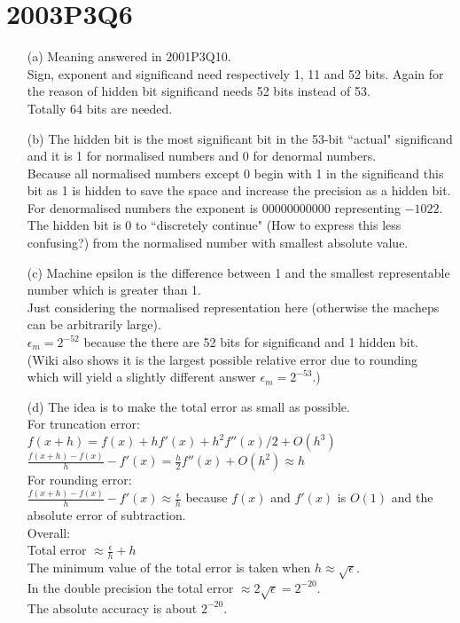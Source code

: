 \documentclass[10pt,twoside,a4paper]{article}
\begin{document}
\section*{2003P3Q6}
\begin{itemize}
\item[(a)]
Meaning answered in 2001P3Q10.
\\Sign, exponent and significand need respectively 1, 11 and 52 bits. Again for the reason of hidden bit significand needs 52 bits instead of 53.
\\Totally 64 bits are needed.
\item[(b)]
The hidden bit is the most significant bit in the 53-bit ``actual" significand and it is 1 for normalised numbers and 0 for denormal numbers.
\\Because all normalised numbers except 0 begin with 1 in the significand this bit as 1 is hidden to save the space and increase the precision as a hidden bit.
\\For denormalised numbers the exponent is $00000000000$ representing $-1022$. The hidden bit is 0 to ``discretely continue" (How to express this less confusing?) from the normalised number with smallest absolute value.
\item[(c)]
Machine epsilon is the difference between 1 and the smallest representable number which is greater than 1.
\\Just considering the normalised representation here (otherwise the macheps can be arbitrarily large).
\\$\epsilon_m=2^{-52}$ because the there are 52 bits for significand and 1 hidden bit.
\\(Wiki also shows it is the largest possible relative error due to rounding which will yield a slightly different answer $\epsilon_m=2^{-53}$.)
\item[(d)]
The idea is to make the total error as small as possible.
\\For truncation error:
\\$f(x+h)=f(x)+hf'(x)+h^2f''(x)/2+O(h^3)$
\\$\frac{f(x+h)-f(x)}{h}-f'(x)=\frac{h}{2}f''(x)+O(h^2)\approx h$
\\For rounding error:
\\$\frac{f(x+h)-f(x)}{h}-f'(x) \approx \frac{\epsilon}{h}$ because $f(x)$ and $f'(x)$ is $O(1)$ and the absolute error of subtraction.
\\Overall:
\\Total error $\approx \frac{\epsilon}{h} + h$ 
\\The minimum value of the total error is taken when $h\approx\sqrt{\epsilon}$.
\\In the double precision the total error $\approx 2\sqrt{\epsilon} = 2^{-20}$.
\\The absolute accuracy is about $2^{-20}$.


\end{itemize}
\end{document}
